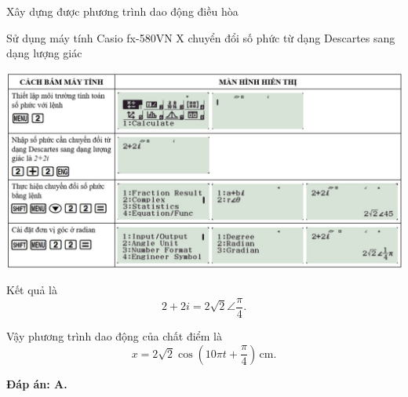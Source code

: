 \begin{dang}{Xây dựng được phương trình dao động điều hòa}
{		Sử dụng máy tính Casio fx-580VN X chuyển đổi số phức từ dạng Descartes sang dạng lượng giác
		\begin{center}
			\includegraphics[scale=0.54]{../figs/VN12-PH-02-A-001-1-V2-9.jpg}
		\end{center}
		
		
		
		Kết quả là
		\begin{equation*}
			2+2i=2\sqrt{2}\angle\dfrac{\pi}{4}.
		\end{equation*}
		
		Vậy phương trình dao động của chất điểm là
		\begin{equation*}
			x=2\sqrt{2}\cos\left(10\pi t+\dfrac{\pi}{4} \right)\,\text{cm}.
		\end{equation*}
		
		\textbf{Đáp án: A.}
	}
\end{dang}
